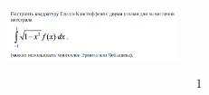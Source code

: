 \documentclass[varwidth,12pt]{standalone}
\begin{document}
\begin{figure}[h!]
    \centering
    \includegraphics[width=5cm]{question.png}
\end{figure}

\begin{equation*}
    1
\end{equation*}
\end{document}
